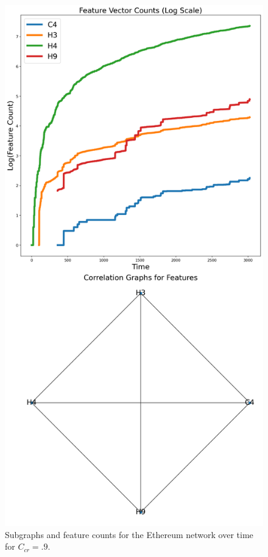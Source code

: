 \documentclass[a4paper,11pt]{article}
\begin{document}
\begin{figure}[h!]
    \includegraphics[width=.8\linewidth]{Images/Ethereum_2/connected_components.png}
    \centering
    \caption{Subgraphs and feature counts for the Ethereum network over time for $C_{cr}=.9$.}
\end{figure}
\clearpage
\pagebreak
\end{document}
